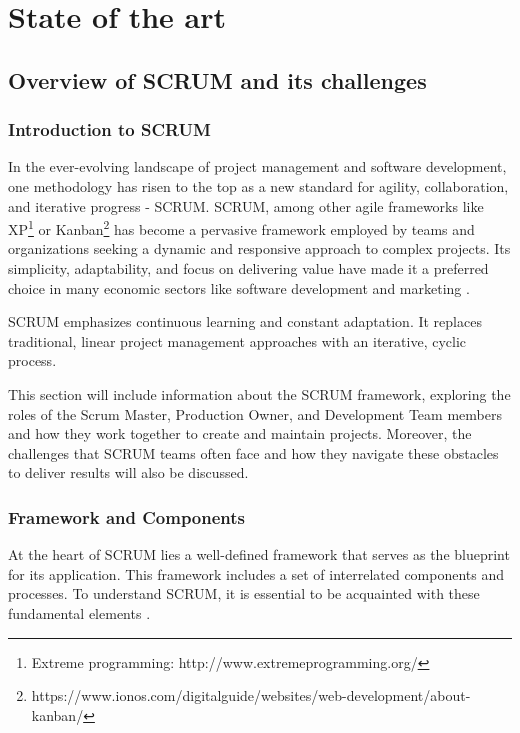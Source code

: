 \chapter{State of the art}

\label{Chapter2}

\section{Overview of SCRUM and its challenges}
\subsection{Introduction to SCRUM}

In the ever-evolving landscape of project management and software development, 
one methodology has risen to the top as a new standard for agility, collaboration, 
and iterative progress - SCRUM. SCRUM, among other agile frameworks like XP\footnote{Extreme programming: http://www.extremeprogramming.org/} or Kanban\footnote{https://www.ionos.com/digitalguide/websites/web-development/about-kanban/} has become a pervasive framework employed by 
teams and organizations seeking a dynamic and responsive approach to complex projects. 
Its simplicity, adaptability, and focus on delivering value have made it a preferred 
choice in many economic sectors like software development 
and marketing \parencite{AgileTransformationSurvey}.

SCRUM emphasizes continuous learning and constant adaptation. 
It replaces traditional, linear project management approaches with an iterative, cyclic process. 

This section will include information about the SCRUM framework,
exploring the roles of the Scrum Master, Production Owner,
and Development Team members and how they work together to create and maintain projects. 
Moreover, the challenges that SCRUM teams often face and how they navigate these 
obstacles to deliver results will also be discussed. 

\subsection{Framework and Components}

At the heart of SCRUM lies a well-defined framework that serves as the blueprint for its application. This framework includes a set of interrelated components and processes. To understand SCRUM, it is essential to be acquainted with these fundamental elements \parencite{TheScrumGuide}.

